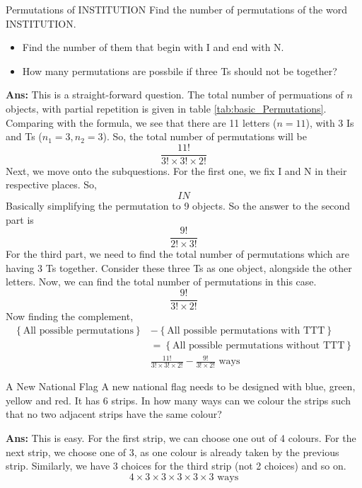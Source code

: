\begin{exampletcb}
    {Permutations of INSTITUTION}{}
    Find the number of permutations of the word INSTITUTION.
    \begin{itemize}
        \item Find the number of them that begin with I and end with N.
        \item How many permutations are possbile if three Ts should not be together?
    \end{itemize}

    \textbf{Ans:} This is a straight-forward question. The total number of permuations of \mbox{$n$} objects, with partial repetition is given in table \ref{tab:basic_Permutations}. Comparing with the formula, we see that there are 11 letters (\mbox{$n=11$}), with 3 Is and Ts (\mbox{$n_1=3, n_2=3$}). So, the total number of permutations will be
    \[
        \frac{11!}{3!\times 3!\times 2!}
    \]
    Next, we move onto the subquestions. For the first one, we fix I and N in their respective places. So,
    \[
        \boxed{I}\boxed{}\boxed{}\boxed{}\boxed{}\boxed{}\boxed{}\boxed{}\boxed{}\boxed{}\boxed{N}
    \] Basically simplifying the permutation to 9 objects. So the answer to the second part is
    \[
        \frac{9!}{2! \times 3!}
    \]
    For the third part, we need to find the total number of permutations which are having 3 Ts together. Consider these three Ts as one object, alongside the other letters. Now, we can find the total number of permutations in this case.
    \[
        \frac{9!}{3!\times 2!}
    \]
    Now finding the complement,
    \begin{align*}
        \left\{\text{All possible permutations}\right\} & - \left\{\text{All possible permutations with TTT}\right\}             \\&= \left\{\text{All possible permutations without TTT}\right\} \\
                                                        & \frac{11!}{3!\times 3!\times 2!} - \frac{9!}{3!\times 2!} \text{ ways}
    \end{align*}
\end{exampletcb}


\begin{exampletcb}
    {A New National Flag}{}
    A new national flag needs to be designed with blue, green, yellow and red. It has 6 strips. In how many ways can we colour the strips such that no two adjacent strips have the same colour?

    \textbf{Ans:} This is easy. For the first strip, we can choose one out of 4 colours. For the next strip, we choose one of 3, as one colour is already taken by the previous strip. Similarly, we have 3 choices for the third strip (not 2 choices) and so on.
    \[
        4\times3\times3\times3\times3\times3\text{ ways}
    \]
\end{exampletcb}


